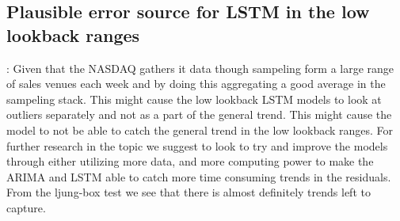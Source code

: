\subsection{Plausible error source for LSTM in the low lookback ranges}:
Given that the NASDAQ gathers it data though sampeling form a large range of sales venues each week and by doing this aggregating a good average in the sampeling stack. This might cause the low lookback LSTM models to look at outliers separately and not as a part of the general trend. This might cause the model to not be able to catch the general trend in the low lookback ranges.
For further research in the topic we suggest to look to try and improve the models through either utilizing more data, and more computing power to make the ARIMA and LSTM able to catch more time consuming trends in the residuals. From the ljung-box test we see that there is almost definitely trends left to capture.